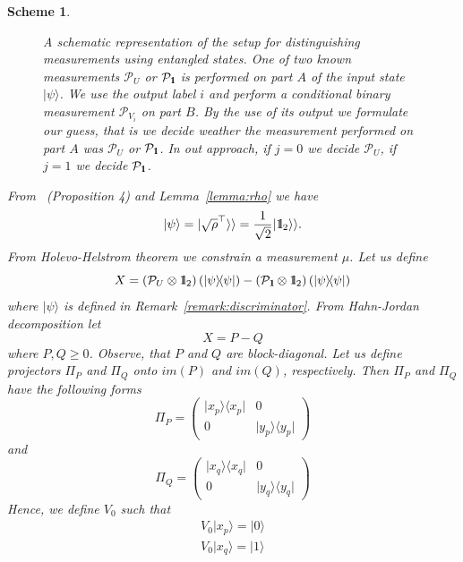 \documentclass[11pt,a4paper,reqno, oneside]{amsart}
\newcommand{\ket}[1]{\ensuremath{|#1\rangle}}
\newcommand{\bra}[1]{\ensuremath{\langle#1|}}
\newcommand{\ketbra}[2]{\ensuremath{\ket{#1} \! \bra{#2}}}
\newcommand{\proj}[1]{\ensuremath{\ketbra{#1}{#1}}}
\newcommand{\1}{{\rm 1\hspace{-0.9mm}l}}
\newcommand{\Id}{{\rm 1\hspace{-0.9mm}l}}
\newcommand{\PP}{\mathcal{P}}
\newtheorem{scheme}{Scheme}
\begin{document}
\begin{scheme}
\begin{figure}[h!]
	\caption{ A schematic representation of the setup for distinguishing
		measurements using entangled states. One of two known measurements 
		$\mathcal{P}_U$
		or $\PP_\Id$ is performed on part $A$ of the input state $\ket{\psi}$. 
		We use
		the output label $i$ and perform a conditional binary measurement
		$\mathcal{P}_{V_i}$ on part $B$. By the use of its output we formulate 
		our guess, 
		that is we decide  
		weather
		the measurement performed on part $A$ was $\mathcal{P}_U$ or 
		$\PP_\Id$. In out approach, if  $ j = 0$ we decide  $\PP_U$, if
		$j = 1$ we decide $\PP_{\Id}$. 
	}\label{fig:theoretical}
\end{figure} 
From ~\cite{puchala2018strategies}(Proposition 4) and Lemma~\ref{lemma:rho} we 
have 
	\begin{equation}
	\ket{\psi} = | \sqrt{\rho}^\top \rangle \rangle = \frac{1}{\sqrt{2}} |\Id_2 
	\rangle \rangle. 
	\end{equation}
	From Holevo-Helstrom theorem  we constrain a measurement $\mu$.  
	Let us define \begin{equation}
	X  = \left( \PP_U \otimes \Id_2 \right)(\proj{\psi}) -  \left( \PP_\Id 
	\otimes \Id_2 \right)(\proj{\psi})
	\end{equation}
	where $\ket{\psi}$ is defined in Remark~\ref{remark:discriminator}. From 
	Hahn-Jordan decomposition let \begin{equation}
	X = P - Q
	\end{equation}
	where $P, Q \ge 0 $. Observe, that $P $ and $Q$ are block-diagonal. 
	Let us define projectors $\Pi_P$ and $\Pi_Q$ onto  $im(P)$ and $im(Q)$, 
	respectively. Then  $\Pi_P$ and $\Pi_Q$ have the following forms
	\begin{equation}
	\Pi_P = \left(\begin{array}{cc}\proj{x_p}&0\\0&\proj{y_p}\end{array}\right) 
	\end{equation}
	and 
	\begin{equation}
	\Pi_Q = \left(\begin{array}{cc}\proj{x_q}&0\\0&\proj{y_q}\end{array}\right) 
	\end{equation}
	Hence, we define $V_0$ such that
	\begin{equation}
	\begin{split}
	V_0 \ket{x_p} = \ket{0} \\ 
	V_0 \ket{x_q} = \ket{1}
	\end{split}

\end{equation}
\end{scheme}
\end{document}
